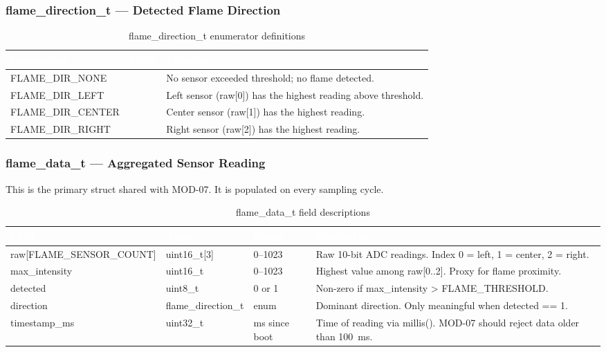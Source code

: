 \documentclass[12pt,a4paper]{article}
\newcommand{\theadtext}[1]{\textcolor{white}{\textbf{#1}}}
\newcommand{\fn}[1]{{\footnotesize\ttfamily #1}}
\begin{document}
\subsubsection{\fn{flame\_direction\_t} --- Detected Flame Direction}

\begin{table}[H]
\centering\small
\begin{tabularx}{\textwidth}{L{4cm} C{1cm} X}
\toprule
{}
\theadtext{Enumerator} & \theadtext{Value} & \theadtext{Meaning} \\
\midrule
{}   \fn{FLAME\_DIR\_NONE}   & \fn{0} & No sensor exceeded threshold; no flame detected. \\
 \fn{FLAME\_DIR\_LEFT}   & \fn{1} & Left sensor (\fn{raw[0]}) has the highest reading above threshold. \\
   \fn{FLAME\_DIR\_CENTER} & \fn{2} & Center sensor (\fn{raw[1]}) has the highest reading. \\
 \fn{FLAME\_DIR\_RIGHT}  & \fn{3} & Right sensor (\fn{raw[2]}) has the highest reading. \\
\bottomrule
\end{tabularx}
\caption{\fn{flame\_direction\_t} enumerator definitions}
\end{table}


\subsubsection{\fn{flame\_data\_t} --- Aggregated Sensor Reading}

This is the primary struct shared with MOD-07. It is populated on every sampling cycle.

\begin{table}[H]
\centering\small
\begin{tabularx}{\textwidth}{L{3.8cm} L{2.5cm} L{2cm} X}
\toprule
{}
\theadtext{Field} & \theadtext{Type} & \theadtext{Range} & \theadtext{Description} \\
\midrule
{}   \fn{raw[FLAME\_SENSOR\_COUNT]} & \fn{uint16\_t[3]} & 0--1023       & Raw 10-bit ADC readings. Index 0 = left, 1 = center, 2 = right. \\
 \fn{max\_intensity}  & \fn{uint16\_t}       & 0--1023       & Highest value among \fn{raw[0..2]}. Proxy for flame proximity. \\
   \fn{detected}        & \fn{uint8\_t}        & 0 or 1        & Non-zero if \fn{max\_intensity > FLAME\_THRESHOLD}. \\
 \fn{direction}       & \fn{flame\_direction\_t} & enum      & Dominant direction. Only meaningful when \fn{detected == 1}. \\
   \fn{timestamp\_ms}   & \fn{uint32\_t}       & ms since boot & Time of reading via \fn{millis()}. MOD-07 should reject data older than 100~ms. \\
\bottomrule
\end{tabularx}
\caption{\fn{flame\_data\_t} field descriptions}
\end{table}
\end{document}
